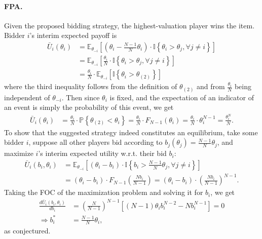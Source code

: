 \documentclass[a4paper]{article}
\begin{document}
\paragraph{FPA.} 
Given the proposed bidding strategy, the highest-valuation player wins the item. Bidder $i$'s interim expected payoff is
\begin{align*}
	\bar{U}_i(\theta_i) &= \mathbb{E}_{\theta_{-i}} \left[ \left( \theta_i - \frac{N-1}{N} \theta_i \right) \cdot \mathbb{I} \left\{ \theta_i > \theta_j, \forall j \neq i \right\} \right]
	\\
	&= \mathbb{E}_{\theta_{-i}} \left[ \frac{\theta_i}{N} \cdot \mathbb{I} \left\{ \theta_i > \theta_j, \forall j \neq i \right\} \right]
	\\
	&= \frac{\theta_i}{N} \cdot \mathbb{E}_{\theta_{-i}} \left[ \mathbb{I} \left\{ \theta_i > \theta_{(2)} \right\} \right]
\end{align*}
where the third inequality follows from the definition of $\theta_{(2)}$ and from $\frac{\theta_i}{N}$ being independent of $\theta_{-i}$. Then since $\theta_i$ is fixed, and the expectation of an indicator of an event is simply the probability of this event, we get
\begin{align*}
	\bar{U}_i(\theta_i) 
	&= \frac{\theta_i}{N} \cdot \mathbb{P} \left\{ \theta_{(2)} < \theta_i \right\}
	= \frac{\theta_i}{N} \cdot F_{N-1} (\theta_i)
	= \frac{\theta_i}{N} \cdot \theta_i^{N-1}
	= \frac{\theta_i^N}{N}.
\end{align*}
To show that the suggested strategy indeed constitutes an equilibrium, take some bidder $i$, suppose all other players bid according to $b_j(\theta_j) = \frac{N-1}{N} \theta_j$, and maximize $i$'s interim expected utility w.r.t. their bid $b_i$:
\begin{align*}
	\bar{U}_i(b_i,\theta_i) &= \mathbb{E}_{\theta_{-i}} \left[ \left( \theta_i - b_i \right) \cdot \mathbb{I} \left\{ b_i > \frac{N-1}{N} \theta_j, \forall j \neq i \right\} \right]
	\\
	&= (\theta_i - b_i) \cdot F_{N-1} \left(\frac{N b_i}{N-1} \right) = (\theta_i - b_i) \cdot \left(\frac{N b_i}{N-1} \right)^{N-1}.
\end{align*}
Taking the FOC of the maximization problem and solving it for $b_i$, we get
\begin{align*}
	\frac{d \bar{U}_i(b_i,\theta_i)}{db_i} 
	&= \left(\frac{N}{N-1} \right)^{N-1} \left[(N-1) \theta_i b_i^{N-2} - N b_i^{N-1} \right] = 0
	\\ \Rightarrow
	b_i^* &= \frac{N-1}{N} \theta_i,
\end{align*}
as conjectured.
\end{document}
